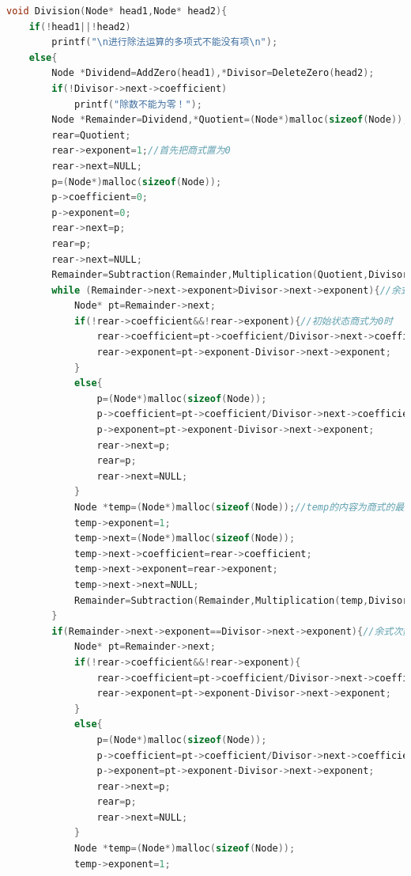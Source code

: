 \documentclass{ctexart}
\begin{document}
	\begin{lstlisting}[language=C, caption=多项式除法]
	void Division(Node* head1,Node* head2){
    if(!head1||!head2)
        printf("\n进行除法运算的多项式不能没有项\n");
    else{
        Node *Dividend=AddZero(head1),*Divisor=DeleteZero(head2);
        if(!Divisor->next->coefficient)
            printf("除数不能为零！");
        Node *Remainder=Dividend,*Quotient=(Node*)malloc(sizeof(Node)),*p=NULL,*rear=NULL;//Dividen表示被除式指针，Divisor表示除式指针，Quotient表示商式指针，Remainder表示余式指针
        rear=Quotient;
        rear->exponent=1;//首先把商式置为0
        rear->next=NULL;
        p=(Node*)malloc(sizeof(Node));
        p->coefficient=0;
        p->exponent=0;
        rear->next=p;
        rear=p;
        rear->next=NULL;
		Remainder=Subtraction(Remainder,Multiplication(Quotient,Divisor));
        while (Remainder->next->exponent>Divisor->next->exponent){//余式次数高于除式，进入循环
            Node* pt=Remainder->next;
            if(!rear->coefficient&&!rear->exponent){//初始状态商式为0时
                rear->coefficient=pt->coefficient/Divisor->next->coefficient;
                rear->exponent=pt->exponent-Divisor->next->exponent;
            }
            else{
                p=(Node*)malloc(sizeof(Node));
                p->coefficient=pt->coefficient/Divisor->next->coefficient;
                p->exponent=pt->exponent-Divisor->next->exponent;
                rear->next=p;
                rear=p;
                rear->next=NULL;
            }
            Node *temp=(Node*)malloc(sizeof(Node));//temp的内容为商式的最后一项
            temp->exponent=1;
            temp->next=(Node*)malloc(sizeof(Node));
            temp->next->coefficient=rear->coefficient;
            temp->next->exponent=rear->exponent;
            temp->next->next=NULL;
            Remainder=Subtraction(Remainder,Multiplication(temp,Divisor));
        }
		if(Remainder->next->exponent==Divisor->next->exponent){//余式次数等于除式
			Node* pt=Remainder->next;
            if(!rear->coefficient&&!rear->exponent){
                rear->coefficient=pt->coefficient/Divisor->next->coefficient;
                rear->exponent=pt->exponent-Divisor->next->exponent;
            }
            else{
                p=(Node*)malloc(sizeof(Node));
                p->coefficient=pt->coefficient/Divisor->next->coefficient;
                p->exponent=pt->exponent-Divisor->next->exponent;
                rear->next=p;
                rear=p;
                rear->next=NULL;
            }
            Node *temp=(Node*)malloc(sizeof(Node));
            temp->exponent=1;

\end{lstlisting}
\end{document}
